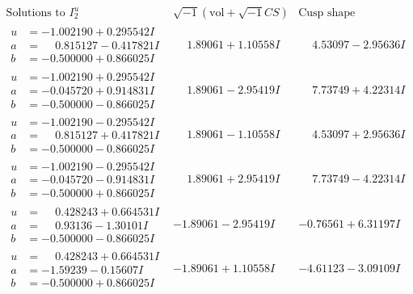 \documentclass[1p]{elsarticle_modified}
\theoremstyle{definition}
\newcommand{\I}{\sqrt{-1}}
\begin{document}
$$\begin{array}{c|c|c}  
\text{Solutions to }I^u_{2}& \I (\text{vol} + \sqrt{-1}CS) & \text{Cusp shape}\\
 \hline 
\begin{aligned}
u &= -1.002190 + 0.295542 I \\
a &= \phantom{-}0.815127 - 0.417821 I \\
b &= -0.500000 + 0.866025 I\end{aligned}
 & \phantom{-}1.89061 + 1.10558 I & \phantom{-}4.53097 - 2.95636 I \\ \hline\begin{aligned}
u &= -1.002190 + 0.295542 I \\
a &= -0.045720 + 0.914831 I \\
b &= -0.500000 - 0.866025 I\end{aligned}
 & \phantom{-}1.89061 - 2.95419 I & \phantom{-}7.73749 + 4.22314 I \\ \hline\begin{aligned}
u &= -1.002190 - 0.295542 I \\
a &= \phantom{-}0.815127 + 0.417821 I \\
b &= -0.500000 - 0.866025 I\end{aligned}
 & \phantom{-}1.89061 - 1.10558 I & \phantom{-}4.53097 + 2.95636 I \\ \hline\begin{aligned}
u &= -1.002190 - 0.295542 I \\
a &= -0.045720 - 0.914831 I \\
b &= -0.500000 + 0.866025 I\end{aligned}
 & \phantom{-}1.89061 + 2.95419 I & \phantom{-}7.73749 - 4.22314 I \\ \hline\begin{aligned}
u &= \phantom{-}0.428243 + 0.664531 I \\
a &= \phantom{-}0.93136 - 1.30101 I \\
b &= -0.500000 - 0.866025 I\end{aligned}
 & -1.89061 - 2.95419 I & -0.76561 + 6.31197 I \\ \hline\begin{aligned}
u &= \phantom{-}0.428243 + 0.664531 I \\
a &= -1.59239 - 0.15607 I \\
b &= -0.500000 + 0.866025 I\end{aligned}
 & -1.89061 + 1.10558 I & -4.61123 - 3.09109 I \\ \hline\begin{aligned}

\end{aligned}
\end{array}$$
\end{document}
